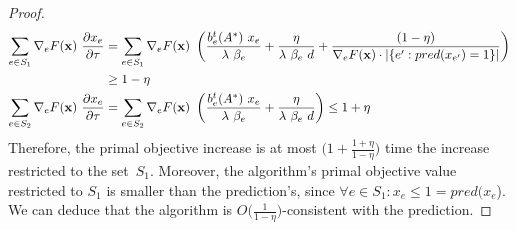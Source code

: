 \begin{proof}
\begin{align*}
\sum_{e \in S_{1}} \nabla_{e} F(\mathbf{x})\ \frac{\partial x_{e}}{ \partial \tau}
&= \sum_{e \in S_{1}} \nabla_{e} F(\mathbf{x})
	\ \left( \frac{b^{t}_{e}(A^{*}) \ x_{e}}{\lambda\ \beta_{e}} + \frac{\eta}{\lambda\ \beta_{e}\ d}
		 + \frac{(1 - \eta)}{\nabla_{e} F(\mathbf{x}) \cdot |\{e': pred(x_{e'}) = 1\}| }
 \right)\\
 &\geq 1 - \eta \\
 \sum_{e \in S_{2}} \nabla_{e} F(\mathbf{x})\ \frac{\partial x_{e}}{ \partial \tau}
&= \sum_{e \in S_{2}} \nabla_{e} F(\mathbf{x})
	\ \left( \frac{b^{t}_{e}(A^{*}) \ x_{e}}{\lambda\ \beta_{e}} + \frac{\eta}{\lambda\ \beta_{e}\ d} \right)
\leq 1 + \eta
\end{align*}
Therefore, the primal objective increase is at most $\bigl(1 +  \frac{1 + \eta}{1 - \eta} \bigr)$ time the increase restricted to
the set~$S_{1}$. Moreover, the algorithm's primal objective value restricted to $S_{1}$ is smaller than
the prediction's, since $\forall e \in S_{1} : x_{e} \leq 1 = pred(x_{e}$).
We can deduce that the algorithm is $O\bigl( \frac{1}{1 - \eta} \bigr)$-consistent with the prediction.
\end{proof}
